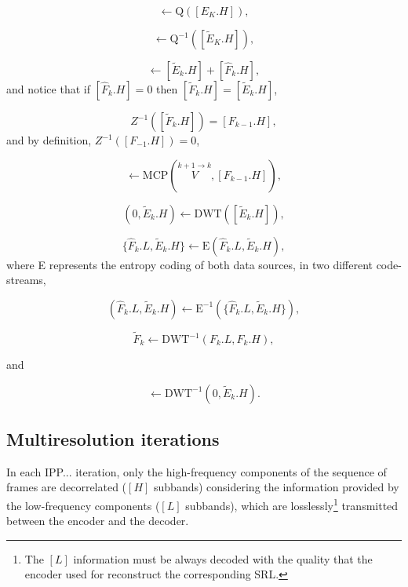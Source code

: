 \begin{equation}
  [\tilde{E}_k.H] \leftarrow \text{Q}([E_K.H]),
  \tag{j}
\end{equation}

\begin{equation}
  [\tilde{E}_k.H] \leftarrow  \text{Q}^{-1}([\tilde{E}_K.H]),
  \tag{k}
\end{equation}

\begin{equation}
  [\tilde{F}_k.H] \leftarrow [\tilde{E}_k.H] + [\hat{F}_k.H],
  \tag{l}
\end{equation}
and notice that if $[\hat{F}_k.H]=0$ then $[\tilde{F}_k.H] =
[\tilde{E}_k.H]$,

\begin{equation}
  Z^{-1}([\tilde{F}_k.H]) = [F_{k-1}.H],
  \tag{m}
\end{equation}
and by definition, $Z^{-1}([F_{-1}.H]) = 0$,

\begin{equation}
  [\hat{F}_k.H] \leftarrow \text{MCP}(\overset{k+1\rightarrow k}{V}, [F_{k-1}.H]),
  \tag{n}
\end{equation}

\begin{equation}
  (0, \tilde{E}_k.H) \leftarrow \text{DWT}([\tilde{E}_k.H]),
  \tag{o}
\end{equation}

\begin{equation}
  \{\hat{F}_k.L, \tilde{E}_k.H\} \leftarrow \text{E}(\hat{F}_k.L, \tilde{E}_k.H),
  \tag{p}
\end{equation}
where E represents the entropy coding of both data sources, in two
different code-streams,

\begin{equation}
  (\hat{F}_k.L, \tilde{E}_k.H) \leftarrow \text{E}^{-1}(\{\hat{F}_k.L, \tilde{E}_k.H\}),
  \tag{q}
\end{equation}

\begin{equation}
  \tilde{F}_k \leftarrow \text{DWT}^{-1}(F_k.L, F_k.H),
  \tag{r}
\end{equation}

and

\begin{equation}
  [\tilde{E}_k.H] \leftarrow \text{DWT}^{-1}(0, \tilde{E}_k.H).
  \tag{s}
\end{equation}

\subsection{Multiresolution iterations}
In each IPP... iteration, only the high-frequency components of the
sequence of frames are decorrelated ($[H]$ subbands) considering the
information provided by the low-frequency components ($[L]$ subbands),
which are losslessly\footnote{The $[L]$ information must be always
decoded with the quality that the encoder used for reconstruct the
corresponding SRL.} transmitted between the encoder and the decoder.

